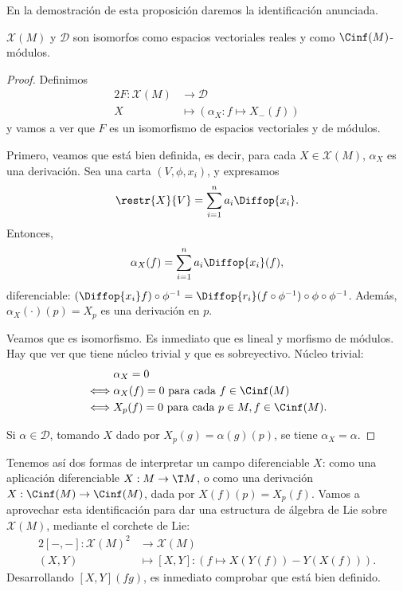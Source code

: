 En la demostración de esta proposición daremos la identificación anunciada.
\begin{nprop}
  $\mathscr{X}(M)$ y $\mathcal{D}$ son isomorfos como espacios vectoriales
  reales y como $\Cinf(M)$-módulos.
\end{nprop}
\begin{proof}
  Definimos
  \begin{alignat*}{2}
    F: \mathscr{X}(M) & \to \mathcal{D} \\
    X & \mapsto \left( \alpha_{X} : f\mapsto X_{-}(f) \right)
  \end{alignat*}
  y vamos a ver que $F$ es un isomorfismo de espacios vectoriales y de módulos.

  Primero, veamos que está bien definida, es decir, para cada $X\in
  \mathscr{X}(M)$, $\alpha_{X}$ es una derivación. Sea una carta
  $(V,\phi,x_{i})$, y expresamos
  \[
    \restr{X}{V} = \sum_{i=1}^{n} a_{i} \Diffop{x_{i}}
    .\] Entonces,
  \[
    \alpha_{X}(f) = \sum_{i=1}^{n} a_{i} \Diffop{x_{i}}(f)
    ,\] diferenciable: $(\Diffop{x_{i}}f)\circ\phi^{-1} =
  \Diffop{r_{i}}(f\circ\phi^{-1})\circ\phi\circ\phi^{-1}$. Además,
  $\alpha_{X}(\cdot)(p) = X_{p}$ es una derivación en $p$.

  Veamos que es isomorfismo. Es inmediato que es lineal y morfismo de
  módulos. Hay que ver que tiene núcleo trivial y que es sobreyectivo. Núcleo trivial:
  \begin{align*}
    & \alpha_{X} = 0 \\
    \iff & \alpha_{X}(f) = 0 \text{ para cada } f\in\Cinf(M) \\
    \iff & X_{p}(f) = 0 \text{ para cada } p\in M, f\in\Cinf(M).
  \end{align*}

  Si $\alpha\in \mathcal{D}$, tomando $X$ dado por $X_{p}(g) = \alpha(g)(p)$,
  se tiene $\alpha_{X} = \alpha$.
\end{proof}

Tenemos así dos formas de interpretar un campo diferenciable $X$: como una
aplicación diferenciable $X: M \to \T M$, o como una derivación $X:\Cinf(M)\to
\Cinf(M)$, dada por $X(f)(p) = X_{p}(f)$. Vamos a aprovechar esta identificación
para dar una estructura de álgebra de Lie sobre $\mathscr{X}(M)$, mediante el
corchete de Lie:
\begin{alignat*}{2}
  [-,-]: \mathscr{X}(M)^{2} & \to \mathscr{X}(M) \\
 (X,Y) & \mapsto [X,Y]: (f\mapsto X(Y(f))-Y(X(f))).
\end{alignat*}
Desarrollando $[X,Y](fg)$, es inmediato comprobar que está bien definido.

